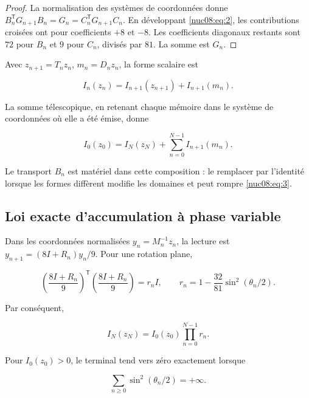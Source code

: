\begin{proof}
La normalisation des systèmes de coordonnées donne
\(B_n^\mathsf TG_{n+1}B_n=G_n=C_n^\mathsf TG_{n+1}C_n\).
En développant \eqref{nuc08:eq:2}, les contributions croisées ont pour coefficients \(+8\) et \(-8\). Les coefficients diagonaux restants sont \(72\) pour \(B_n\) et \(9\) pour \(C_n\), divisés par \(81\). La somme est \(G_n\).
\end{proof}

Avec \(z_{n+1}=T_nz_n\), \(m_n=D_nz_n\), la forme scalaire est

\begin{equation}
\boxed{I_n(z_n)=I_{n+1}(z_{n+1})+I_{n+1}(m_n).}
\label{nuc08:eq:4}
\end{equation}

La somme télescopique, en retenant chaque mémoire dans le système de coordonnées où elle a été émise, donne

\begin{equation}
I_0(z_0)=I_N(z_N)+\sum_{n=0}^{N-1}I_{n+1}(m_n).
\label{nuc08:eq:5}
\end{equation}

Le transport \(B_n\) est matériel dans cette composition : le remplacer par l’identité lorsque les formes diffèrent modifie les domaines et peut rompre \eqref{nuc08:eq:3}.

\subsection{Loi exacte d’accumulation à phase variable}

Dans les coordonnées normalisées \(y_n=M_n^{-1}z_n\), la lecture est
\(y_{n+1}=(8I+R_n)y_n/9\). Pour une rotation plane,


\begin{equation}
\left(\frac{8I+R_n}{9}\right)^\mathsf T
\left(\frac{8I+R_n}{9}\right)=r_n I,\qquad
r_n=1-\frac{32}{81}\sin^2(\theta_n/2).
\label{nuc08:eq:6}
\end{equation}

Par conséquent,

\begin{equation}
I_N(z_N)=I_0(z_0)\prod_{n=0}^{N-1}r_n.
\label{nuc08:eq:7}
\end{equation}

\begin{theorem}
Pour \(I_0(z_0)>0\), le terminal tend vers zéro exactement lorsque

\begin{equation}
\sum_{n\ge0}\sin^2(\theta_n/2)=+\infty.
\label{nuc08:eq:8}
\end{equation}
\end{theorem}

